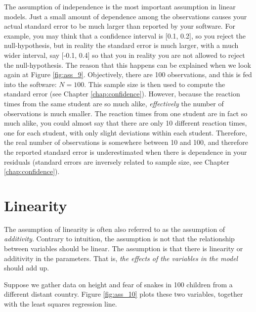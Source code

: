 \documentclass[]{book}\usepackage[]{graphicx}\usepackage[]{color}
\begin{document}
The assumption of independence is the most important assumption in linear models. Just a small amount of dependence among the observations causes your actual standard error to be much larger than reported by your software. For example, you may think that a confidence interval is [0.1, 0.2], so you reject the null-hypothesis, but in reality the standard error is much larger, with a much wider interval, say [-0.1, 0.4] so that you in reality you are not allowed to reject the null-hypothesis. The reason that this happens can be explained when we look again at Figure \ref{fig:ass_9}. Objectively, there are 100 observations, and this is fed into the software: $N=100$. This sample size is then used to compute the standard error (see Chapter \ref{chap:confidence}). However, because the reaction times from the same student are so much alike, \textit{effectively} the number of observations is much smaller. The reaction times from one student are in fact so much alike, you could almost say that there are only 10 different reaction times, one for each student, with only slight deviations within each student. Therefore, the real number of observations is somewhere between 10 and 100, and therefore the reported standard error is underestimated when there is dependence in your residuals (standard errors are inversely related to sample size, see Chapter \ref{chap:confidence}). 



\section{Linearity}

The assumption of linearity is often also referred to as the assumption of \textit{additivity}. Contrary to intuition, the assumption is not that the relationship between variables should be linear. The assumption is that there is linearity or additivity in the parameters. That is, \textit{the effects of the variables in the model} should add up. 

Suppose we gather data on height and fear of snakes in 100 children from a different distant country. Figure \ref{fig:ass_10} plots these two variables, together with the least squares regression line.
\end{document}
